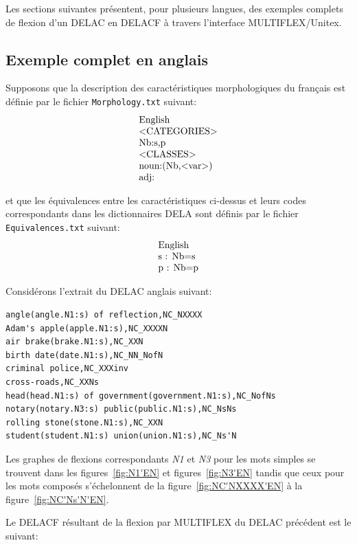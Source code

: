 \bigskip
\noindent Les sections suivantes présentent, pour plusieurs langues, des exemples complets de
flexion d'un DELAC en DELACF à travers l'interface MULTIFLEX/Unitex.

\subsection{Exemple complet en anglais}
Supposons que la description des caractéristiques morphologiques du français est définie par le
fichier \verb+Morphology.txt+ suivant:
\[
\begin{array}[l]{l}
$English$ \\
$<CATEGORIES>$ \\
$Nb:s,p$ \\
$<CLASSES>$ \\
$noun:(Nb,<var>)$ \\
$adj:$
\end{array}
\]

\bigskip
\noindent et que les équivalences entre les caractéristiques ci-dessus et leurs codes correspondants
dans les dictionnaires DELA sont définis par le fichier \verb+Equivalences.txt+ suivant: 
\[
\begin{array}[l]{l}
$English$ \\
$s : Nb=s$ \\
$p : Nb=p$ \\
\end{array}
\]

\bigskip
\noindent Considérons l'extrait du DELAC anglais suivant:

\begin{verbatim}
angle(angle.N1:s) of reflection,NC_NXXXX
Adam's apple(apple.N1:s),NC_XXXXN
air brake(brake.N1:s),NC_XXN
birth date(date.N1:s),NC_NN_NofN
criminal police,NC_XXXinv
cross-roads,NC_XXNs
head(head.N1:s) of government(government.N1:s),NC_NofNs
notary(notary.N3:s) public(public.N1:s),NC_NsNs
rolling stone(stone.N1:s),NC_XXN
student(student.N1:s) union(union.N1:s),NC_Ns'N
\end{verbatim}

\bigskip
\noindent Les graphes de flexions correspondants \emph{N1} et \emph{N3} pour les mots simples
se trouvent dans les figures~\ref{fig:N1'EN} et figures~\ref{fig:N3'EN} tandis que ceux pour les mots
composés s'échelonnent de la figure~\ref{fig:NC'NXXXX'EN} à la figure~\ref{fig:NC'Ns'N'EN}. 

\bigskip
\noindent Le DELACF résultant de la flexion par MULTIFLEX du DELAC précédent est le suivant:

